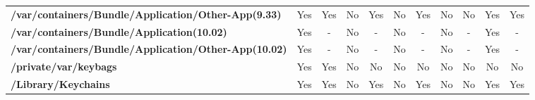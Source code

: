 \begin{center}
{\begin{tabular}{|>{\bfseries} l | C | C | C | C | C | C | C | C | C | C |}
					/var/containers/Bundle/Application/Other-App(9.33) & Yes & Yes & \color{green}No & \color{red}Yes & \color{green}No & \color{red}Yes & No & No & Yes & Yes\\ 
					/var/containers/Bundle/Application(10.02) & Yes & - & No & - & No & - & No & - & Yes & -\\ 
					/var/containers/Bundle/Application/Other-App(10.02) & Yes & - & No & - & No & - & No & - & Yes & -\\ 
					/private/var/keybags & Yes & Yes & No & No & No & No & No & No & No & No\\ 
					/Library/Keychains & Yes & Yes & \color{green}No & \color{red}Yes & \color{green}No & \color{red}Yes & No & No & Yes & Yes\\ 

			\end{tabular}
		}
	\end{center}



